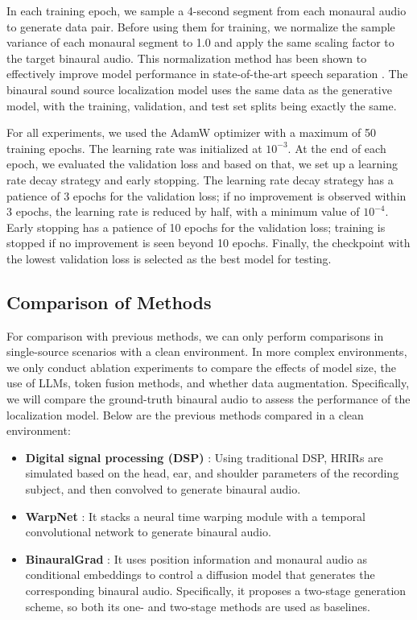 \documentclass{IEEEtran}
\begin{document}
In each training epoch, we sample a 4-second segment from each monaural audio to generate data pair. Before using them for training, we normalize the sample variance of each monaural segment to 1.0 and apply the same scaling factor to the target binaural audio. This normalization method has been shown to effectively improve model performance in state-of-the-art speech separation \cite{wang2023tf}. The binaural sound source localization model uses the same data as the generative model, with the training, validation, and test set splits being exactly the same.

For all experiments, we used the AdamW optimizer with a maximum of 50 training epochs. The learning rate was initialized at $10^{-3}$. At the end of each epoch, we evaluated the validation loss and based on that, we set up a learning rate decay strategy and early stopping. The learning rate decay strategy has a patience of 3 epochs for the validation loss; if no improvement is observed within 3 epochs, the learning rate is reduced by half, with a minimum value of $10^{-4}$. Early stopping has a patience of 10 epochs for the validation loss; training is stopped if no improvement is seen beyond 10 epochs. Finally, the checkpoint with the lowest validation loss is selected as the best model for testing.

\subsection{Comparison of Methods}
For comparison with previous methods, we can only perform comparisons in single-source scenarios with a clean environment. In more complex environments, we only conduct ablation experiments to compare the effects of model size, the use of LLMs, token fusion methods, and whether data augmentation. Specifically, we will compare the ground-truth binaural audio to assess the performance of the localization model. Below are the previous methods compared in a clean environment:
\begin{itemize}
    \item \textbf{Digital signal processing (DSP)} \cite{brinkmann2019hutubs}: Using traditional DSP, HRIRs are simulated based on the head, ear, and shoulder parameters of the recording subject, and then convolved to generate binaural audio.
    \item \textbf{WarpNet} \cite{richard2021neural}: It stacks a neural time warping module with a temporal convolutional network to generate binaural audio.
    \item \textbf{BinauralGrad} \cite{leng2022binauralgrad}: It uses position information and monaural audio as conditional embeddings to control a diffusion model that generates the corresponding binaural audio. Specifically, it proposes a two-stage generation scheme, so both its one- and two-stage methods are used as baselines.
\end{itemize}
\end{document}

